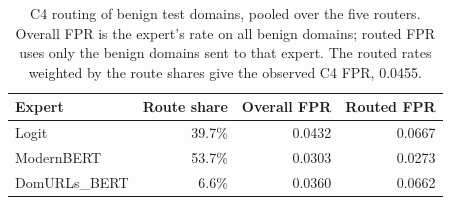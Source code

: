 \begin{table}[!t]
\caption{C4 routing of benign test domains, pooled over the five routers. Overall FPR is the expert's rate on all benign domains; routed FPR uses only the benign domains sent to that expert. The routed rates weighted by the route shares give the observed C4 FPR, 0.0455.}
\label{tab:benign-routing}
\centering\small
\begin{tabular}{@{}lrrr@{}}
\toprule
Expert & Route share & Overall FPR & Routed FPR \\
\midrule
Logit & 39.7\% & 0.0432 & 0.0667 \\
ModernBERT & 53.7\% & 0.0303 & 0.0273 \\
DomURLs\_BERT & 6.6\% & 0.0360 & 0.0662 \\
\bottomrule
\end{tabular}
\end{table}

